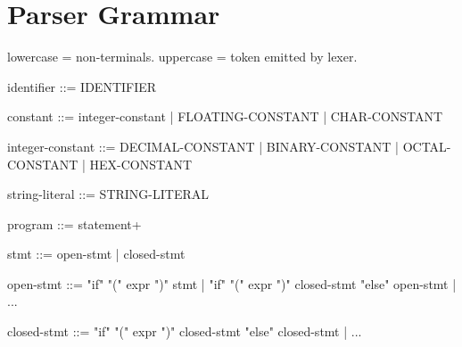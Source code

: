 \documentclass[../00-main.tex]{subfiles}
\begin{document}
\chapter{Parser Grammar}

lowercase = non-terminals.
uppercase = token emitted by lexer.

\begin{GrammarListing}
identifier ::= IDENTIFIER

constant ::= integer-constant
           | FLOATING-CONSTANT
           | CHAR-CONSTANT

integer-constant ::= DECIMAL-CONSTANT
                   | BINARY-CONSTANT
                   | OCTAL-CONSTANT
                   | HEX-CONSTANT

string-literal ::= STRING-LITERAL
\end{GrammarListing}

\begin{GrammarListing}
program ::= statement+

stmt        ::= open-stmt | closed-stmt

open-stmt   ::= "if" "(" expr ")" stmt
              | "if" "(" expr ")" closed-stmt "else" open-stmt
              | ...

closed-stmt ::= "if" "(" expr ")" closed-stmt "else" closed-stmt
              | ...
\end{GrammarListing}
\end{document}
